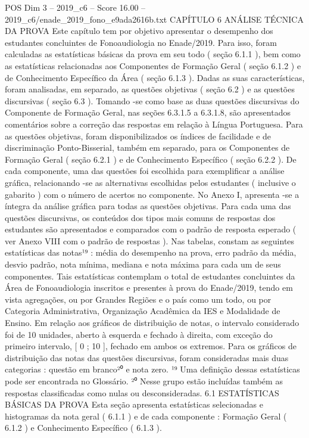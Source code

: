 \begin{textsample}{POS Dim 3 – 2019\_c6 – Score 16.00 – 2019\_c6/enade\_2019\_fono\_e9ada2616b.txt}  \label{ex:f3_pos_019}
CAPÍTULO 6 ANÁLISE TÉCNICA DA PROVA Este capítulo tem por objetivo apresentar o desempenho dos estudantes concluintes de Fonoaudiologia no Enade/2019.
Para isso, foram calculadas as estatísticas básicas da prova em seu todo ( seção 6.1.1 ), bem como as estatísticas relacionadas aos Componentes de Formação Geral ( seção 6.1.2 ) e de Conhecimento Específico da Área ( seção 6.1.3 ).
Dadas as suas características, foram analisadas, em separado, as questões objetivas ( seção 6.2 ) e as questões discursivas ( seção 6.3 ).
Tomando -se como base as duas questões discursivas do Componente de Formação Geral, nas seções 6.3.1.5 a 6.3.1.8, são apresentados comentários sobre a correção das respostas em relação à Língua Portuguesa.
Para as questões objetivas, foram disponibilizados os índices de facilidade e de discriminação Ponto-Bisserial, também em separado, para os Componentes de Formação Geral ( seção 6.2.1 ) e de Conhecimento Específico ( seção 6.2.2 ).
De cada componente, uma das questões foi escolhida para exemplificar a análise gráfica, relacionando -se as alternativas escolhidas pelos estudantes ( inclusive o gabarito ) com o número de acertos no componente.
No Anexo I, apresenta -se a íntegra da análise gráfica para todas as questões objetivas.
Para cada uma das questões discursivas, os conteúdos dos tipos mais comuns de respostas dos estudantes são apresentados e comparados com o padrão de resposta esperado ( ver Anexo VIII com o padrão de respostas ).
Nas tabelas, constam as seguintes estatísticas das notas¹⁹ : média do desempenho na prova, erro padrão da média, desvio padrão, nota mínima, mediana e nota máxima para cada um de seus componentes.
Tais estatísticas contemplam o total de estudantes concluintes da Área de Fonoaudiologia inscritos e presentes à prova do Enade/2019, tendo em vista agregações, ou por Grandes Regiões e o país como um todo, ou por Categoria Administrativa, Organização Acadêmica da IES e Modalidade de Ensino.
Em relação aos gráficos de distribuição de notas, o intervalo considerado foi de 10 unidades, aberto à esquerda e fechado à direita, com exceção do primeiro intervalo, [ 0 ; 10 ], fechado em ambos os extremos.
Para os gráficos de distribuição das notas das questões discursivas, foram consideradas mais duas categorias : questão em branco²⁰ e nota zero. ¹⁹ Uma definição dessas estatísticas pode ser encontrada no Glossário. ²⁰ Nesse grupo estão incluídas também as respostas classificadas como nulas ou desconsideradas. 6.1 ESTATÍSTICAS BÁSICAS DA PROVA Esta seção apresenta estatísticas selecionadas e histogramas da nota geral ( 6.1.1 ) e de cada componente : Formação Geral ( 6.1.2 ) e Conhecimento Específico ( 6.1.3 ).

\end{textsample}
